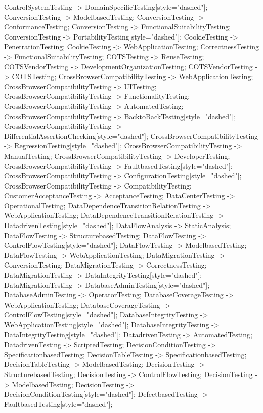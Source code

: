 \documentclass{article}
\begin{document}
{ControlSystemTesting -> DomainSpecificTesting[style="dashed"];
ConversionTesting -> ModelbasedTesting;
ConversionTesting -> ConformanceTesting;
ConversionTesting -> FunctionalSuitabilityTesting;
ConversionTesting -> PortabilityTesting[style="dashed"];
CookieTesting -> PenetrationTesting;
CookieTesting -> WebApplicationTesting;
CorrectnessTesting -> FunctionalSuitabilityTesting;
COTSTesting -> ReuseTesting;
COTSVendorTesting -> DevelopmentOrganizationTesting;
COTSVendorTesting -> COTSTesting;
CrossBrowserCompatibilityTesting -> WebApplicationTesting;
CrossBrowserCompatibilityTesting -> UITesting;
CrossBrowserCompatibilityTesting -> FunctionalityTesting;
CrossBrowserCompatibilityTesting -> AutomatedTesting;
CrossBrowserCompatibilityTesting -> BacktoBackTesting[style="dashed"];
CrossBrowserCompatibilityTesting -> DifferentialAssertionChecking[style="dashed"];
CrossBrowserCompatibilityTesting -> RegressionTesting[style="dashed"];
CrossBrowserCompatibilityTesting -> ManualTesting;
CrossBrowserCompatibilityTesting -> DeveloperTesting;
CrossBrowserCompatibilityTesting -> FaultbasedTesting[style="dashed"];
CrossBrowserCompatibilityTesting -> ConfigurationTesting[style="dashed"];
CrossBrowserCompatibilityTesting -> CompatibilityTesting;
CustomerAcceptanceTesting -> AcceptanceTesting;
DataCenterTesting -> OperationalTesting;
DataDependenceTransitionRelationTesting -> WebApplicationTesting;
DataDependenceTransitionRelationTesting -> DatadrivenTesting[style="dashed"];
DataFlowAnalysis -> StaticAnalysis;
DataFlowTesting -> StructurebasedTesting;
DataFlowTesting -> ControlFlowTesting[style="dashed"];
DataFlowTesting -> ModelbasedTesting;
DataFlowTesting -> WebApplicationTesting;
DataMigrationTesting -> ConversionTesting;
DataMigrationTesting -> CorrectnessTesting;
DataMigrationTesting -> DataIntegrityTesting[style="dashed"];
DataMigrationTesting -> DatabaseAdminTesting[style="dashed"];
DatabaseAdminTesting -> OperatorTesting;
DatabaseCoverageTesting -> WebApplicationTesting;
DatabaseCoverageTesting -> ControlFlowTesting[style="dashed"];
DatabaseIntegrityTesting -> WebApplicationTesting[style="dashed"];
DatabaseIntegrityTesting -> DataIntegrityTesting[style="dashed"];
DatadrivenTesting -> AutomatedTesting;
DatadrivenTesting -> ScriptedTesting;
DecisionConditionTesting -> SpecificationbasedTesting;
DecisionTableTesting -> SpecificationbasedTesting;
DecisionTableTesting -> ModelbasedTesting;
DecisionTesting -> StructurebasedTesting;
DecisionTesting -> ControlFlowTesting;
DecisionTesting -> ModelbasedTesting;
DecisionTesting -> DecisionConditionTesting[style="dashed"];
DefectbasedTesting -> FaultbasedTesting[style="dashed"];
}
\end{document}
